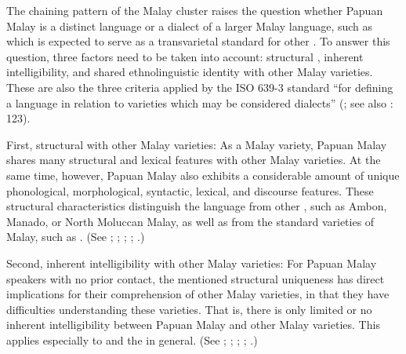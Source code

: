 The chaining pattern of the Malay cluster raises the question whether Papuan Malay is a distinct language or a dialect of a larger Malay language, such as  which is expected to serve as a transvarietal standard {for other .} To answer this question, three factors need to be taken into account: structural , inherent intelligibility, and shared ethnolinguistic identity with other Malay varieties. These are also the three criteria applied by the ISO 639-3 standard  ``for defining a language in relation to varieties which may be considered dialects'' (\citealt{Lewis.2016b}; see also \citealt{Hymes.1974}: 123).

 
First, structural  with other Malay varieties: As a Malay variety, Papuan Malay shares many structural and lexical features with other Malay varieties. At the same time, however, Papuan Malay also exhibits a considerable amount of unique phonological, morphological, syntactic, lexical, and discourse features. These structural characteristics distinguish the language from other , such as Ambon, Manado, or North Moluccan Malay, as well as from the standard varieties of Malay, such as . (See \citealt[3]{Anderbeck.2007}; \citealt[1]{Donohue.2003}; \citeyear*[73]{Donohue.2007b}; \citealt[20]{Paauw.2009}; \citealt[110--111]{Scott.2008}.)



Second, inherent intelligibility with other Malay varieties: For Papuan Malay speakers with no prior contact, the mentioned structural uniqueness has direct implications for their comprehension of other Malay varieties, in that they have difficulties understanding these varieties. That is, there is only limited or no inherent intelligibility between Papuan Malay and other Malay varieties. This applies especially to  and the  in general. (See \citealt[3]{Anderbeck.2007}; \citealt[72--73]{Donohue.2007b}; \citealt[20]{Paauw.2009}; \citealt[27--28]{Suharno.1979}; \citealt[213--214]{Yembise.2011}.)



